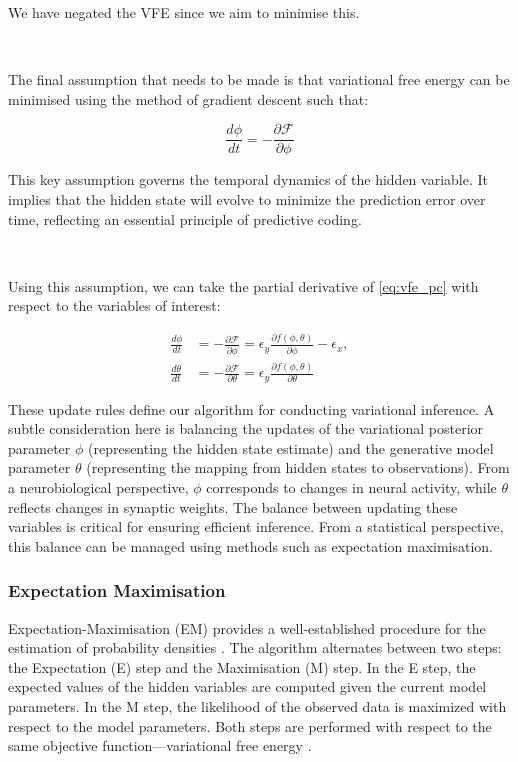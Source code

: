 \documentclass{article}
\begin{document}
We have negated the VFE since we aim to minimise this. 

\

The final assumption that needs to be made is that variational free energy can be minimised using the method of gradient descent such that:

\begin{equation}
	\frac{d \phi}{dt} = -\frac{\partial \mathcal{F}}{\partial \phi}
\end{equation}

This key assumption governs the temporal dynamics of the hidden variable. It implies that the hidden state will evolve to minimize the prediction error over time, reflecting an essential principle of predictive coding.

\

Using this assumption, we can take the partial derivative of \ref{eq:vfe_pc} with respect to the variables of interest:

\begin{equation}\label{eq:pc_update_equations}
	\begin{aligned}
		\frac{d \phi}{dt} &= -\frac{\partial \mathcal{F}}{\partial \phi} = \epsilon_y \frac{\partial f(\phi, \theta)}{\partial \phi} - \epsilon_x, \\
    \frac{d \theta}{dt} &= - \frac{\partial \mathcal{F}}{\partial \theta}  = \epsilon_y \frac{\partial f(\phi, \theta)}{\partial \theta}
    \end{aligned}
\end{equation}

These update rules define our algorithm for conducting variational inference. A subtle consideration here is balancing the updates of the variational posterior parameter $\phi$ (representing the hidden state estimate) and the generative model parameter $\theta$ (representing the mapping from hidden states to observations). From a neurobiological perspective, $\phi$ corresponds to changes in neural activity, while $\theta$ reflects changes in synaptic weights. The balance between updating these variables is critical for ensuring efficient inference. From a statistical perspective, this balance can be managed using methods such as expectation maximisation.

\subsubsection{Expectation Maximisation}

Expectation-Maximisation (EM) provides a well-established procedure for the estimation of probability densities \citep{friston2003learning}. The algorithm alternates between two steps: the Expectation (E) step and the Maximisation (M) step. In the E step, the expected values of the hidden variables are computed given the current model parameters. In the M step, the likelihood of the observed data is maximized with respect to the model parameters. Both steps are performed with respect to the same objective function—variational free energy \citep{friston2003learning}.
\end{document}
